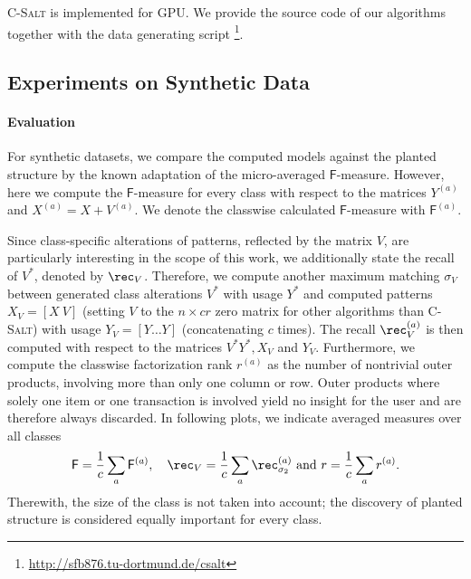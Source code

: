 \textsc{C-Salt} is implemented for GPU. We provide the source code of our algorithms together with the data generating script \footnote{\url{http://sfb876.tu-dortmund.de/csalt}}.
\subsection{Experiments on Synthetic Data}\label{sec:CS:synthExp}
\paragraph{Evaluation}
For synthetic datasets, we compare the computed models against the planted structure by the known adaptation of the micro-averaged $\mathsf{F}$-measure. However, here we compute the $\mathsf{F}$-measure for every class with respect to the matrices $Y^{(a)}$ and $X^{(a)}=X+V^{(a)}$. We denote the classwise calculated $\mathsf{F}$-measure with $\mathsf{F}^{(a)}$.

Since class-specific alterations of patterns, reflected by the matrix $V$, are particularly interesting in the scope of this work, we additionally state the recall of $V^*$, denoted by $\rec_V$. Therefore, we compute another maximum matching $\sigma_V$ between generated class alterations $V^*$ with usage $Y^*$ and computed patterns $X_V=[X\ V]$ (setting $V$ to the $n\times cr$ zero matrix for other algorithms than \textsc{C-Salt}) with usage $Y_V=[Y \ldots Y]$ (concatenating $c$ times). The recall $\rec_V^{(a)}$ is then computed with respect to the matrices $V^* Y^*, X_V$ and $Y_V$.
Furthermore, we compute the classwise factorization rank $r^{(a)}$ as the number of nontrivial outer products, involving more than only one column or row. Outer products where solely one item or one transaction is involved yield no insight for the user and are therefore always discarded. In following plots, we indicate averaged measures over all classes
\[ \mathsf{F}=\frac{1}{c}\sum_a \mathsf{F}^{(a)}, \quad \rec_V=\frac{1}{c}\sum_a \rec^{(a)}_{\sigma_2} \text{ and } r=\frac{1}{c}\sum_a r^{(a)}.
\]
Therewith, the size of the class is not taken into account; the discovery of planted structure is considered equally important for every class.
